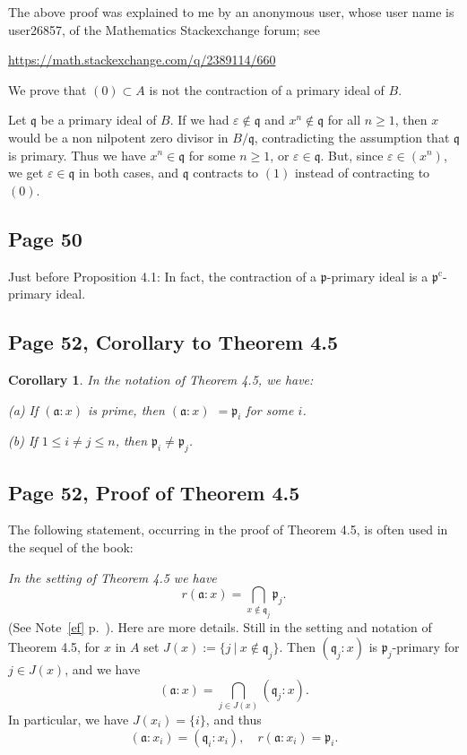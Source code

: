 \documentclass[parskip=half,fontsize=12pt]{scrartcl}%
\newcommand{\oo}{\operatorname}\newcommand{\ooo}{\operatorname*}
\newcommand{\mf}{\mathfrak}
\newcommand{\aaa}{\mf a}
\newcommand{\ppp}{\mf p}
\newtheorem{cor}[thm]{Corollary}
\begin{document}
The above proof was explained to me by an anonymous user, whose user name is user26857, of the Mathematics Stackexchange forum; see 

\href{https://math.stackexchange.com/q/2389114/660}{https://math.stackexchange.com/q/2389114/660}

We prove that $(0)\subset A$ is not the contraction of a primary ideal of $B$.

Let $\mathfrak q$ be a primary ideal of $B$. If we had $\varepsilon\notin\mathfrak q$ and $x^n\notin\mathfrak q$ for all $n\ge1$, then $x$ would be a non nilpotent zero divisor in $B/\mathfrak q$, contradicting the assumption that $\mathfrak q$ is primary. Thus we have $x^n\in\mathfrak q$ for some $n\ge1$, or $\varepsilon\in\mathfrak q$. But, since $\varepsilon\in(x^n)$, we get $\varepsilon\in\mathfrak q$ in both cases, and $\mathfrak q$ contracts to $(1)$ instead of contracting to $(0)$.

\subsection{Page 50}\label{contrpry}%

Just before Proposition 4.1: In fact, the contraction of a $\ppp$-primary ideal is a $\ppp^{\oo c}$-primary ideal.

\subsection{Page 52, Corollary to Theorem 4.5}%

\begin{cor}\label{c45}
In the notation of Theorem 4.5, we have:

(a) If $(\aaa:x)$ is prime, then $(\aaa:x)$ $=\ppp_i$ for some $i$.

(b) If $1\le i\ne j\le n$, then $\ppp_i\ne\ppp_j$.
\end{cor}

\subsection{Page 52, Proof of Theorem 4.5}%

The following statement, occurring in the proof of Theorem 4.5, is often used in the sequel of the book:

{\em In the setting of Theorem 4.5 we have} 
\begin{equation}\label{45}
r(\mf a:x)=\bigcap_{x\notin\mf q_j}\ppp_j.
\end{equation}
(See Note~\ref{ef} p.~\pageref{ef}). Here are more details. Still in the setting and notation of Theorem 4.5, for $x$ in $A$ set $J(x):=\{j\ |\ x\notin\mf q_j\}$. Then $(\mf q_j:x)$ is $\ppp_j$-primary for $j\in J(x)$, and we have 
$$
(\mf a:x)=\bigcap_{j\in J(x)}(\mf q_j:x).
$$ 
In particular, we have $J(x_i)=\{i\}$, and thus 
$$
(\mf a:x_i)=(\mf q_i:x_i),\quad r(\mf a:x_i)=\ppp_i.
$$
\end{document}
